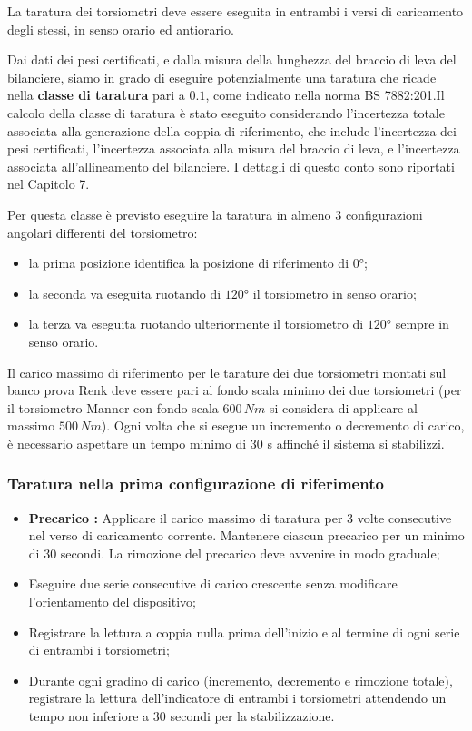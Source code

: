 \documentclass[a4paper, twoside]{article}
\begin{document}
La taratura dei torsiometri deve essere eseguita in entrambi i versi di caricamento degli stessi, in senso orario ed antiorario. 

Dai dati dei pesi certificati, e dalla misura della lunghezza del braccio di leva del bilanciere, siamo in grado di eseguire potenzialmente una taratura che ricade nella  \textbf{classe di taratura} pari a $\mathbf{0.1}$, come indicato nella norma  BS 7882:201.Il calcolo della classe di taratura è stato eseguito considerando l'incertezza totale associata alla generazione della coppia di riferimento, che include l'incertezza dei pesi certificati, l'incertezza associata alla misura del braccio di leva, e l'incertezza associata all'allineamento del bilanciere. I dettagli di questo conto sono riportati nel Capitolo 7.

Per questa classe è previsto eseguire la taratura in almeno 3 configurazioni angolari differenti del torsiometro:
\begin{itemize}
    \item la prima posizione identifica la posizione di riferimento di $0$°;
    \item la seconda va eseguita ruotando di $120$° il torsiometro in senso orario;
    \item la terza va eseguita ruotando ulteriormente il torsiometro di $120$° sempre in senso orario.
\end{itemize}

Il carico massimo di riferimento per le tarature dei due torsiometri montati sul banco prova Renk deve essere pari al fondo scala minimo dei due torsiometri (per il torsiometro Manner con fondo scala $600\,Nm$ si considera di applicare al massimo $500\,Nm$). Ogni volta che si esegue un incremento o decremento di carico, è necessario aspettare un tempo minimo di $30$ s affinché il sistema si stabilizzi.

\subsubsection{Taratura nella prima configurazione di riferimento}

\begin{itemize}
    \item \textbf{Precarico :} Applicare il carico massimo di taratura per 3 volte consecutive nel verso di caricamento corrente. Mantenere ciascun precarico per un minimo di 30 secondi. La rimozione del precarico deve avvenire in modo graduale;
    \item Eseguire due serie consecutive di carico crescente senza modificare l'orientamento del dispositivo;
    \item Registrare la lettura a coppia nulla prima dell'inizio e al termine di ogni serie di entrambi i torsiometri;
    \item Durante ogni gradino di carico (incremento, decremento e rimozione totale), registrare la lettura dell'indicatore di entrambi i torsiometri attendendo un tempo non inferiore a 30 secondi per la stabilizzazione.
\end{itemize}
\end{document}
